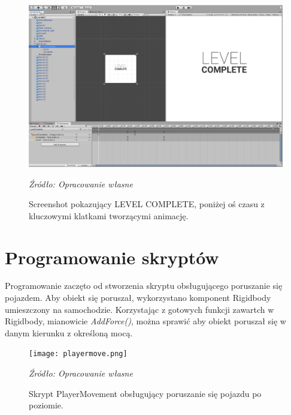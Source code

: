 \begin{figure}[!h]
\centering
  \includegraphics[width=0.80\linewidth]{levelcomplete2.png}
  \caption{Screenshot pokazujący LEVEL COMPLETE, poniżej oś czasu z kluczowymi klatkami tworzącymi animację.}\label{rys_3}
  \begin{minipage}[t]{0.75\linewidth}
    \emph{Źródło: Opracowanie własne}
  \end{minipage}
\end{figure}

\newpage
\section{Programowanie skryptów}
\indent Programowanie zaczęto od stworzenia skryptu obsługującego poruszanie się pojazdem. Aby obiekt się poruszał, wykorzystano komponent Rigidbody umieszczony na samochodzie. Korzystając z gotowych funkcji zawartch w Rigidbody, mianowicie \textit{AddForce()}, można sprawić aby obiekt poruszał się w danym kierunku z określoną mocą.

\begin{figure}[!h]
\centering
  \texttt{[image: playermove.png]}
  \caption{Skrypt PlayerMovement obsługujący poruszanie się pojazdu po poziomie.}\label{rys_4}
  \begin{minipage}[t]{0.75\linewidth}
    \emph{Źródło: Opracowanie własne}
  \end{minipage}
\end{figure}


